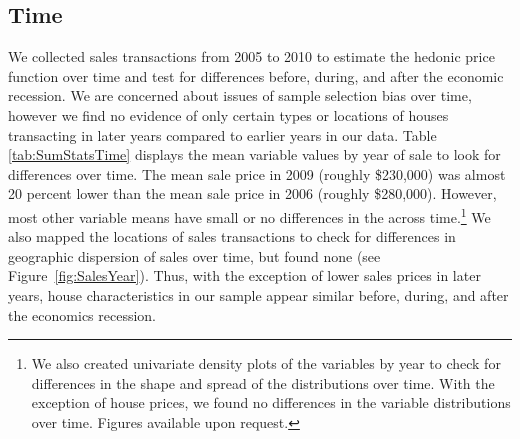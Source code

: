 \documentclass{article}\usepackage{graphicx, color}
\begin{document}
\subsection{Time}
We collected sales transactions from 2005 to 2010 to estimate the hedonic price function over time and test for differences before, during, and after the economic recession. We are concerned about issues of sample selection bias over time, however we find no evidence of only certain types or locations of houses transacting in later years compared to earlier years in our data. Table \ref{tab:SumStatsTime} displays the mean variable values by year of sale to look for differences over time. The mean sale price in 2009 (roughly \$230,000) was almost 20 percent lower than the mean sale price in 2006 (roughly \$280,000). However, most other variable means have small or no differences in the across time.\footnote{We also created univariate density plots of the variables by year to check for differences in the shape and spread of the distributions over time. With the exception of house prices, we found no differences in the variable distributions over time. Figures available upon request.} We also mapped the locations of sales transactions to check for differences in geographic dispersion of sales over time, but found none (see Figure~\ref{fig:SalesYear}). Thus, with the exception of lower sales prices in later years, house characteristics in our sample appear similar before, during, and after the economics recession. 
\end{document}
